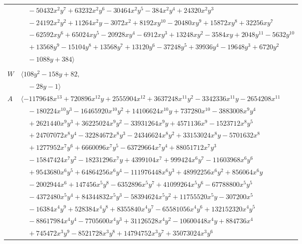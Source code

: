 \documentclass[11pt]{article}
\begin{document}
\begin{longtable}{@{}ll@{}}
 & $\quad -50432x^{2}y^{7}+63232x^{2}y^{6}-30464x^{2}y^{5}-384x^{2}y^{4}+24320x^{2}y^{3}$\\
 & $\quad -24192x^{2}y^{2}+11264x^{2}y-3072x^{2}+8192xy^{10}-20480xy^{9}+15872xy^{8}+32256xy^{7}$\\
 & $\quad -62592xy^{6}+65024xy^{5}-20928xy^{4}-6912xy^{3}+13248xy^{2}-3584xy+2048y^{11}-5632y^{10}$\\
 & $\quad +13568y^{9}-15104y^{8}+13568y^{7}+13120y^{6}-37248y^{5}+39936y^{4}-19648y^{3}+6720y^{2}$\\
 & $\quad -1088y+384\rangle$\\
\addlinespace[2pt]
\multicolumn{2}{@{}p{0.97\textwidth}@{}}{$i=40$, $D_i=16$, $\rho_{ij}$: $4{:}1, \allowbreak 12{:}2, \allowbreak 17{:}2, \allowbreak 28{:}2, \allowbreak 32{:}2, \allowbreak 36{:}1, \allowbreak 49{:}1, \allowbreak 52{:}2$}\\
$W$ & $\langle 108y^{2}-158y+82,$\\
 & $\quad -28y-1\rangle$\\
$A$ & $\langle -1179648x^{13}+720896x^{12}y+2555904x^{12}+3637248x^{11}y^{2}-3342336x^{11}y-2654208x^{11}$\\
 & $\quad -180224x^{10}y^{3}-16465920x^{10}y^{2}+14106624x^{10}y+737280x^{10}-3883008x^{9}y^{4}$\\
 & $\quad +2621440x^{9}y^{3}+36225024x^{9}y^{2}-33931264x^{9}y+4571136x^{9}-1523712x^{8}y^{5}$\\
 & $\quad +24707072x^{8}y^{4}-32284672x^{8}y^{3}-24346624x^{8}y^{2}+33153024x^{8}y-5701632x^{8}$\\
 & $\quad +1277952x^{7}y^{6}+6660096x^{7}y^{5}-63729664x^{7}y^{4}+88051712x^{7}y^{3}$\\
 & $\quad -15847424x^{7}y^{2}-18231296x^{7}y+4399104x^{7}+999424x^{6}y^{7}-11603968x^{6}y^{6}$\\
 & $\quad +9543680x^{6}y^{5}+64864256x^{6}y^{4}-111976448x^{6}y^{3}+48992256x^{6}y^{2}+856064x^{6}y$\\
 & $\quad -2002944x^{6}+147456x^{5}y^{8}-6352896x^{5}y^{7}+41099264x^{5}y^{6}-67788800x^{5}y^{5}$\\
 & $\quad -4372480x^{5}y^{4}+84344832x^{5}y^{3}-58394624x^{5}y^{2}+11755520x^{5}y-307200x^{5}$\\
 & $\quad -16384x^{4}y^{9}+528384x^{4}y^{8}+8355840x^{4}y^{7}-65581056x^{4}y^{6}+132152320x^{4}y^{5}$\\
 & $\quad -88617984x^{4}y^{4}-7705600x^{4}y^{3}+31126528x^{4}y^{2}-10600448x^{4}y+884736x^{4}$\\
 & $\quad +745472x^{3}y^{9}-8521728x^{3}y^{8}+14794752x^{3}y^{7}+35073024x^{3}y^{6}$\\

\end{longtable}
\end{document}
